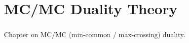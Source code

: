 \chapter{MC/MC Duality Theory}
\label{chap:03}
\paragraph{}Chapter on MC/MC (min-common / max-crossing) duality.



% 
% 

